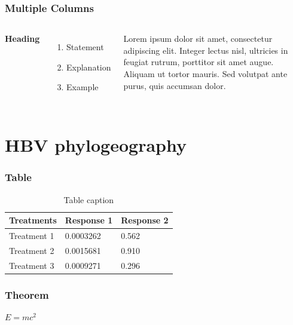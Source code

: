 \documentclass{beamer}
\begin{document}
\begin{frame}

\end{frame}


\begin{frame}
\frametitle{Multiple Columns}
\begin{columns}[c] %

\textbf{Heading}
\begin{enumerate}
\item Statement
\item Explanation
\item Example
\end{enumerate}

Lorem ipsum dolor sit amet, consectetur adipiscing elit. Integer lectus nisl, ultricies in feugiat rutrum, porttitor sit amet augue. Aliquam ut tortor mauris. Sed volutpat ante purus, quis accumsan dolor.

\end{columns}
\end{frame}

\section{HBV phylogeography}

\begin{frame}
\frametitle{Table}
\begin{table}
\begin{tabular}{l l l}
\toprule
\textbf{Treatments} & \textbf{Response 1} & \textbf{Response 2}\\
\midrule
Treatment 1 & 0.0003262 & 0.562 \\
Treatment 2 & 0.0015681 & 0.910 \\
Treatment 3 & 0.0009271 & 0.296 \\
\bottomrule
\end{tabular}
\caption{Table caption}
\end{table}
\end{frame}


\begin{frame}
\frametitle{Theorem}
\begin{theorem}
$E = mc^2$
\end{theorem}
\end{frame}
\end{document}
